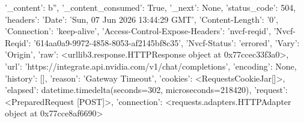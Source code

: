
{'_content': b'', '_content_consumed': True, '_next': None, 'status_code': 504, 'headers': {'Date': 'Sun, 07 Jun 2026 13:44:29 GMT', 'Content-Length': '0', 'Connection': 'keep-alive', 'Access-Control-Expose-Headers': 'nvcf-reqid', 'Nvcf-Reqid': '614aa0a9-9972-4858-8053-af2145bf8c35', 'Nvcf-Status': 'errored', 'Vary': 'Origin'}, 'raw': <urllib3.response.HTTPResponse object at 0x77ccec33f3a0>, 'url': 'https://integrate.api.nvidia.com/v1/chat/completions', 'encoding': None, 'history': [], 'reason': 'Gateway Timeout', 'cookies': <RequestsCookieJar[]>, 'elapsed': datetime.timedelta(seconds=302, microseconds=218420), 'request': <PreparedRequest [POST]>, 'connection': <requests.adapters.HTTPAdapter object at 0x77cce8af6690>}
